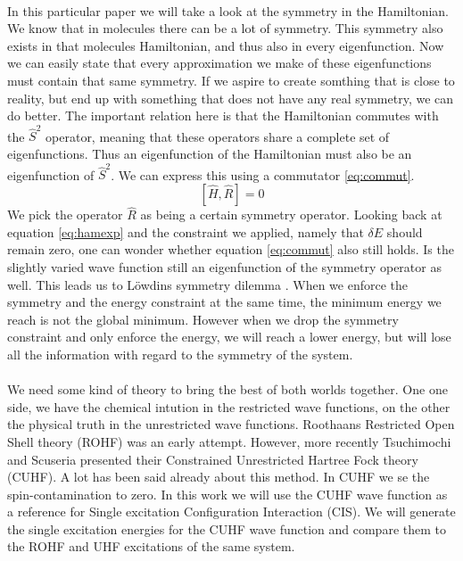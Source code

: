 \documentclass[twoside,twocolumn,9pt]{article}
\begin{document}
\paragraph*{}
In this particular paper we will take a look at the symmetry in the Hamiltonian. We know that in molecules there can be a lot of symmetry. This symmetry also exists in that 
molecules Hamiltonian, and thus also in every eigenfunction. Now we can easily state that every approximation we make of these eigenfunctions must contain that same symmetry. 
If we aspire to create somthing that is close to reality, but end up with something that does not have any real symmetry, we can do better. The important relation here is that 
the Hamiltonian commutes with the $\hat{S}^2$ operator, meaning that these operators share a complete set of eigenfunctions. Thus an eigenfunction of the Hamiltonian must also
be an eigenfunction of $\hat{S}^2$. We can express this using a commutator \eqref{eq:commut}.
\begin{equation}\label{eq:commut}
  [\hat{H}, \hat{R}] = 0
\end{equation}
We pick the operator $\hat{R}$ as being a certain symmetry operator. Looking back at equation \eqref{eq:hamexp} and the constraint we applied, namely that $\delta E$ should 
remain zero, one can wonder whether equation \eqref{eq:commut} also still holds. Is the slightly varied wave function still an eigenfunction of the symmetry operator as well.
This leads us to Löwdins symmetry dilemma \cite{Lowdin1963}. When we enforce the symmetry and the energy constraint at the same time, the minimum energy we reach is not the
global minimum. However when we drop the symmetry constraint and only enforce the energy, we will reach a lower energy, but will lose all the information with regard to the
symmetry of the system.
\paragraph*{}
We need some kind of theory to bring the best of both worlds together. One one side, we have the chemical intution in the restricted wave functions, on the other the physical
truth in the unrestricted wave functions. Roothaans Restricted Open Shell theory (ROHF)\cite{Roothaan1960} was an early attempt. However, more recently Tsuchimochi and Scuseria
presented their Constrained Unrestricted Hartree Fock theory (CUHF)\cite{Scuseria2010}. A lot has been said already about this method\cite{Plakhutin2014, Scuseria2011}. In CUHF we
se the spin-contamination to zero. In this work we will use the CUHF wave function as a reference for Single excitation Configuration Interaction (CIS). We will generate the single
excitation energies for the CUHF wave function and compare them to the ROHF and UHF excitations of the same system. 
\end{document}
